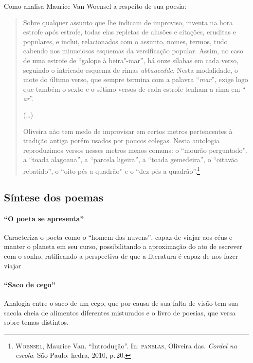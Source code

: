 Como analisa Maurice Van Woensel a respeito de sua poesia:

\begin{quote}
Sobre qualquer assunto que lhe indicam de improviso,
inventa na hora estrofe após estrofe, todas elas repletas de
alusões e citações, eruditas e populares, e inclui,
relacionados com o assunto, nomes, termos, tudo cabendo
nos minuciosos esquemas da versificação popular. Assim,
no caso de uma estrofe de ``galope à
beira"-mar'', há onze sílabas em cada verso, seguindo o intricado
esquema de rimas \textit{abbaaccddc}. Nesta modalidade, o mote
do último verso, que sempre termina com a palavra
``\textit{mar}'', exige logo que também o sexto e o sétimo versos de cada
estrofe tenham a rima em ``-\textit{ar}''.

(\ldots)

Oliveira não tem medo de improvisar em certos metros
pertencentes à tradição antiga porém usados por poucos
colegas. Nesta antologia reproduzimos versos nesses metros
menos comuns: o ``mourão perguntado'', a
``toada alagoana'', a ``parcela ligeira'', a ``toada gemedeira'', o
``oitavão rebatido'', o ``oito pés a quadrão'' e o ``dez pés a
quadrão''.\footnote{\textsc{Woensel}, Maurice Van. ``Introdução''. In: \textsc{panelas}, Oliveira das. \textit{Cordel na escola}. São Paulo: hedra, 2010, p.\,20.}
\end{quote}

\subsection{Síntese dos poemas}

\paragraph{``O poeta se apresenta''}

Caracteriza o poeta como o ``homem das
nuvens'', capaz de viajar aos céus e manter o planeta
em seu curso, possibilitando a aproximação do ato de escrever com o
sonho, ratificando a perspectiva de que a literatura é capaz de nos
fazer viajar.
 
\paragraph{``Saco de cego''}

Analogia entre o saco de um cego, que por causa de sua falta de visão
tem sua sacola cheia de alimentos diferentes misturados e o livro de
poesias, que versa sobre temas distintos.

